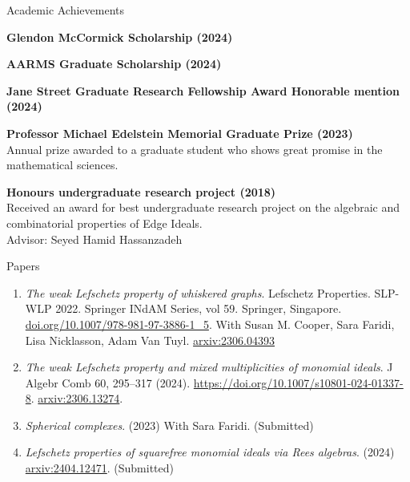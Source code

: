 \documentclass[12pt]{resume} %
\begin{document}


\begin{rSection}{Academic Achievements}

{\bf Glendon McCormick Scholarship (2024)}

{\bf AARMS Graduate Scholarship (2024)}

{\bf Jane Street Graduate Research Fellowship Award Honorable mention (2024)}

{\bf Professor Michael Edelstein Memorial Graduate Prize (2023)}
\\
Annual prize awarded to a graduate student who shows great promise in the mathematical sciences. 


{\bf Honours undergraduate research project (2018)}
\\
Received an award for best undergraduate research project on the algebraic and combinatorial properties of Edge Ideals.
\\
Advisor: Seyed Hamid Hassanzadeh
\end{rSection}

\begin{rSection}{Papers}

\begin{enumerate}
    \item \textit{The weak Lefschetz property of whiskered graphs}.  Lefschetz Properties. SLP-WLP 2022. Springer INdAM Series, vol 59. Springer, Singapore. \href{https://doi.org/10.1007/978-981-97-3886-1_5}{doi.org/10.1007/978-981-97-3886-1\_5}.  With Susan M. Cooper, Sara Faridi, Lisa Nicklasson, Adam Van Tuyl.  \href{https://arxiv.org/abs/2306.04393}{arxiv:2306.04393}
    \item \textit{The weak Lefschetz property and mixed multiplicities of monomial ideals}. J Algebr Comb 60, 295–317 (2024). \href{https://doi.org/10.1007/s10801-024-01337-8}{https://doi.org/10.1007/s10801-024-01337-8}. \href{https://arxiv.org/abs/2306.13274}{arxiv:2306.13274}.
    \item \textit{Spherical complexes}. (2023) With Sara Faridi. (Submitted)%
    \item \textit{Lefschetz properties of squarefree monomial ideals via Rees algebras}. (2024) \href{https://arxiv.org/abs/2404.12471}{arxiv:2404.12471}. (Submitted) 
\end{enumerate}
\end{rSection}
\end{document}
